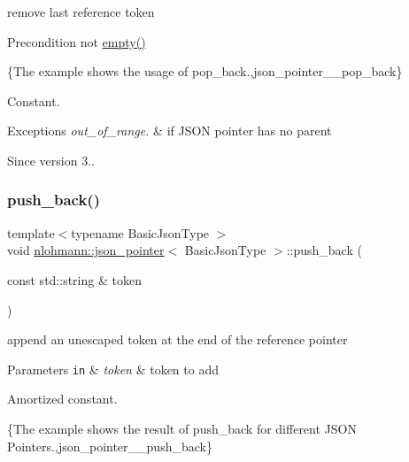 remove last reference token 

\begin{DoxyPrecond}{Precondition}
not {\ttfamily \hyperlink{classnlohmann_1_1json__pointer_a649252bda4a2e75a0915b11a25d8bcc3}{empty()}}
\end{DoxyPrecond}
\{The example shows the usage of {\ttfamily pop\+\_\+back}.,json\+\_\+pointer\+\_\+\+\_\+pop\+\_\+back\}

Constant.


\begin{DoxyExceptions}{Exceptions}
{\em out\+\_\+of\+\_\+range.} & if J\+S\+ON pointer has no parent\\
\hline
\end{DoxyExceptions}
\begin{DoxySince}{Since}
version 3.. 
\end{DoxySince}
\mbox{\label{classnlohmann_1_1json__pointer_a697d12b5bd6205f8866691b166b7c7dc}} 
\subsubsection{\texorpdfstring{push\+\_\+back()}{push\_back()}\hspace{0.1cm}{\footnotesize\ttfamily [1/2]}}
{\footnotesize\ttfamily template$<$typename Basic\+Json\+Type $>$ \\
void \hyperlink{classnlohmann_1_1json__pointer}{nlohmann\+::json\+\_\+pointer}$<$ Basic\+Json\+Type $>$\+::push\+\_\+back (\begin{DoxyParamCaption}\item[{const std\+::string \&}]{token }\end{DoxyParamCaption})\hspace{0.3cm}{\ttfamily [inline]}}



append an unescaped token at the end of the reference pointer 


\begin{DoxyParams}[1]{Parameters}
\mbox{\tt in}  & {\em token} & token to add\\
\hline
\end{DoxyParams}
Amortized constant.

\{The example shows the result of {\ttfamily push\+\_\+back} for different J\+S\+ON Pointers.,json\+\_\+pointer\+\_\+\+\_\+push\+\_\+back\}

